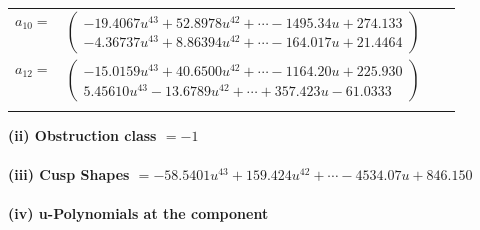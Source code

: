 \documentclass[1p]{elsarticle_modified}
\theoremstyle{definition}
\begin{document}
\begin{tabular}{m{7pt} m{180pt} m{7pt} m{180pt} }
\flushright $a_{10}=$&$\begin{pmatrix}-19.4067 u^{43}+52.8978 u^{42}+\cdots-1495.34 u+274.133\\-4.36737 u^{43}+8.86394 u^{42}+\cdots-164.017 u+21.4464\end{pmatrix}$ \\
\flushright $a_{12}=$&$\begin{pmatrix}-15.0159 u^{43}+40.6500 u^{42}+\cdots-1164.20 u+225.930\\5.45610 u^{43}-13.6789 u^{42}+\cdots+357.423 u-61.0333\end{pmatrix}$\\&\end{tabular}
\flushleft \textbf{(ii) Obstruction class $= -1$}\\~\\
\flushleft \textbf{(iii) Cusp Shapes $= -58.5401 u^{43}+159.424 u^{42}+\cdots-4534.07 u+846.150$}\\~\\
\newpage\renewcommand{\arraystretch}{1}
\flushleft \textbf{(iv) u-Polynomials at the component}\newline \\
\end{document}
